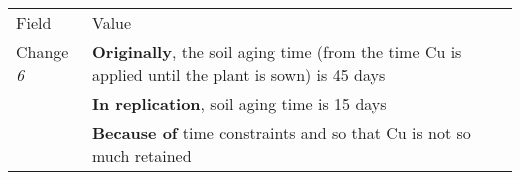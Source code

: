 \begin{table*}[h]
\label{tab:plantEng}
  \centering

\begin{tabularx}{\textwidth}{
  >{\hsize=0.25\hsize}X
  >{\hsize=0.8\hsize}X}
  
    \noalign{\smallskip}\hline\noalign{\smallskip}
  
  Field &  Value  \\ 
  \noalign{\smallskip}\hline\noalign{\smallskip}
  Change \textit{6}   & \textbf{Originally}, the soil aging time (from the time Cu is applied until the plant is sown) is 45 days  \\& \textbf{In replication}, soil aging time is 15 days 
    \\& \textbf{Because of} time constraints and so that Cu is not so much retained\\  
 

\end{tabularx}
\end{table*}
